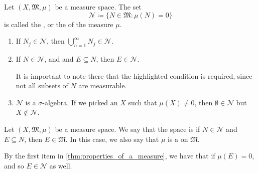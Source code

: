 \documentclass[notoc,notitlepage]{tufte-book}
\begin{document}
\begin{defn}\label{defn:null_set_of_a_measure}
  Let $(X, \mathfrak{M}, \mu)$ be a measure space.
  The set
  \begin{equation*}
    \mathcal{N} \coloneqq \{ N \in \mathfrak{M} : \mu(N) = 0 \}
  \end{equation*}
  is called the ,
  or the  of the measure $\mu$.
\end{defn}

\begin{remark}
  \begin{enumerate}
    \item If $N_j \in \mathcal{N}$, then
      $\bigcup_{n=1}^{\infty} N_j \in \mathcal{N}$.
    \item If $N \in \mathcal{N}$, and 
      and $E \subseteq N$,
      then $E \in \mathcal{N}$.

      It is important to note there that the highlighted condition is required,
      since not all subsets of $N$ are measurable.
    \item $\mathcal{N}$ is  a $\sigma$-algebra.
      If we picked an $X$ such that $\mu(X) \neq 0$,
      then $\emptyset \in \mathcal{N}$ but $X \notin \mathcal{N}$.
  \end{enumerate}
\end{remark}

\begin{defn}\label{defn:complete_measure_space}
  Let $(X, \mathfrak{M}, \mu)$ be a measure space.
  We say that the space is  if
  $N \in \mathcal{N}$ and $E \subseteq N$, then $E \in \mathfrak{M}$.
  In this case, we also say that $\mu$ is a 
  on $\mathfrak{M}$.
\end{defn}

\begin{remark}
  By the first item in \cref{thm:properties_of_a_measure},
  we have that if $\mu(E) = 0$, and so $E \in \mathcal{N}$ as well.
\end{remark}
\end{document}
